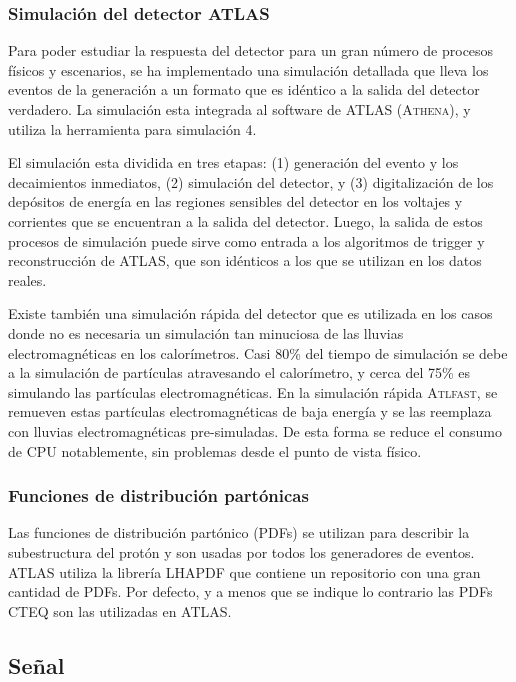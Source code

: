 \subsubsection{Simulación del detector ATLAS}

Para poder estudiar la respuesta del detector para un gran número de procesos
físicos y escenarios, se ha implementado una simulación detallada que lleva los
eventos de la generación a un formato que es idéntico a la salida del detector
verdadero\cite{AtlasSim}. La simulación esta integrada al software de ATLAS (\textsc{Athena}),
y utiliza la herramienta para simulación {\geant}4\cite{Geant4}.

El simulación esta dividida en tres etapas: (1) generación del evento y los
decaimientos inmediatos, (2) simulación del detector, y (3) digitalización de
los depósitos de energía en las regiones sensibles del detector en los voltajes
y corrientes que se encuentran a la salida del detector. Luego, la salida de
estos procesos de simulación puede sirve como entrada a los algoritmos de
trigger y reconstrucción de ATLAS, que son idénticos a los que se utilizan en
los datos reales.

Existe también una simulación rápida del detector que es utilizada en los casos
donde no es necesaria un simulación tan minuciosa de las lluvias
electromagnéticas en los calorímetros. Casi 80\% del tiempo de simulación se
debe a la simulación de partículas atravesando el calorímetro, y cerca del 75\%
es simulando las partículas electromagnéticas. En la simulación rápida
\textsc{Atlfast}\cite{Richter-Was:683751}, se remueven estas partículas
electromagnéticas de baja energía y se las reemplaza con lluvias
electromagnéticas pre-simuladas. De esta forma se reduce el consumo de CPU
notablemente, sin problemas desde el punto de vista físico.


\subsubsection{Funciones de distribución partónicas}

Las funciones de distribución partónico (PDFs) se utilizan para describir la
subestructura del protón y son usadas por todos los generadores de eventos.
ATLAS utiliza la librería LHAPDF\cite{Bourilkov:2006cj} que contiene un
repositorio con una gran
cantidad de PDFs. Por defecto, y a menos que se indique lo contrario las PDFs
CTEQ son las utilizadas en ATLAS.

\subsection{Se\~nal}

